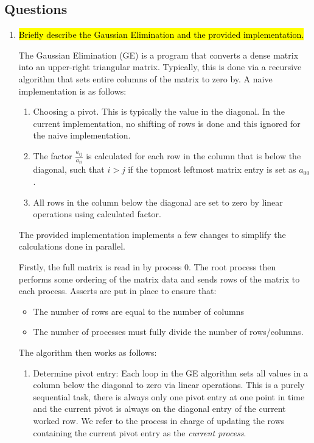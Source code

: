 \subsection{Questions}
\begin{enumerate}
	\item \hl{Briefly describe the Gaussian Elimination and the provided implementation.}

	The Gaussian Elimination (GE) is a program that converts a dense matrix into an upper-right triangular matrix. Typically, this is done via a recursive algorithm that sets entire columns of the matrix to zero by. A naive implementation is as follows:
\begin{enumerate}
	\item Choosing a pivot. This is typically the value in the diagonal. In the current implementation, no shifting of rows is done and this ignored for the naive implementation.
	\item The factor $\frac{a_{ij}}{a_{ii}}$ is calculated for each row in the column that is below the diagonal, such that $i > j$ if the topmost leftmost matrix entry is set as $a_{00}$.
	\item All rows in the column below the diagonal are set to zero by linear operations using calculated factor.
\end{enumerate}

The provided implementation implements a few changes to simplify the calculations done in parallel.

Firstly, the full matrix is read in by process 0. The root process then performs some ordering of the matrix data and sends rows of the matrix to each process. Asserts are put in place to ensure that:
\begin{itemize}
	\item The number of rows are equal to the number of columns
	\item The number of processes must fully divide the number of rows/columns.
\end{itemize}

The algorithm then works as follows:
\begin{enumerate}
\item Determine pivot entry: Each loop in the GE algorithm sets all values in a column below the diagonal to zero via linear operations. This is a purely sequential task, there is always only one pivot entry at one point in time and the current pivot is always on the diagonal entry of the current worked row. We refer to the process in charge of updating the rows containing the current pivot entry as the \textit{current process}. 


\end{enumerate}
\end{enumerate}

